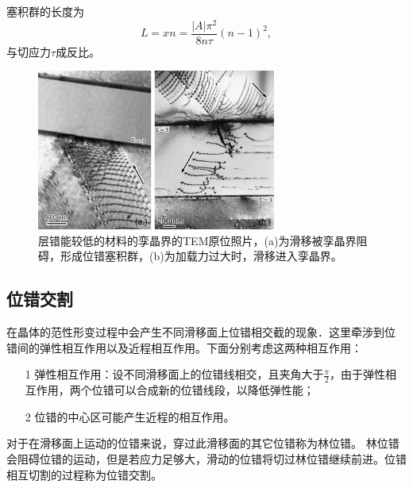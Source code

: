                 塞积群的长度为
                \begin{equation}
                    L=xn=\frac{\vert A\vert \pi^2}{8n\tau}(n-1)^2,
                \end{equation}
                与切应力$\tau$成反比。
                \begin{figure}[ht]
                    \centering
                    \includegraphics[width=0.7\textwidth]{fig/pile_up_groups_&_slip_transmit_twin_boundary.jpg}
                    \caption{层错能较低的材料的孪晶界的TEM原位照片\cite{SANGID2011283}，(a)为滑移被孪晶界阻碍，形成位错塞积群，(b)为加载力过大时，滑移进入孪晶界。}
                    \label{实际晶体中的塞积群}
                \end{figure}
            
            \subsection{位错交割}
                在晶体的范性形变过程中会产生不同滑移面上位错相交截的现象．这里牵涉到位
                错间的弹性相互作用以及近程相互作用。下面分别考虑这两种相互作用：
                \begin{itemize}
                    \item[1] 弹性相互作用：设不同滑移面上的位错线相交，且夹角大于$\frac{\pi}{2}$，由于弹性相互作用，两个位错可以合成新的位错线段，以降低弹性能；
                    \item[2] 位错的中心区可能产生近程的相互作用。
                \end{itemize}

                对于在滑移面上运动的位错来说，穿过此滑移面的其它位错称为林位错。
                林位错会阻碍位错的运动，但是若应力足够大，滑动的位错将切过林位错继续前进。位错相互切割的过程称为位错交割。

